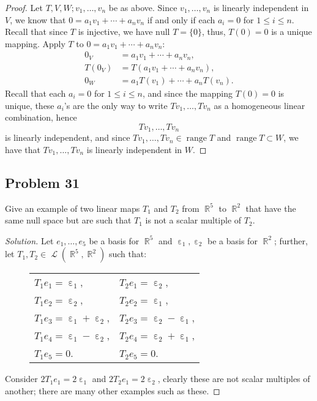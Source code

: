 \documentclass[letterpaper, 12pt]{amsart}
\DeclareMathOperator{\R}{\mathbb{R}}				%
\DeclareMathOperator{\Ell}{\mathscr{L}}				%
\DeclareMathOperator{\ep}{\varepsilon}				%
\renewcommand{\null}{\text{null }}					%
\DeclareMathOperator{\range}{\text{range }}			%
\theoremstyle{definition}  							%
\begin{document}
		\begin{proof}
		Let $T, V, W; v_{1}, \dots, v_{n}$ be as above.
		Since $v_{1}, \dots, v_{n}$ is linearly independent in $V$, we know that $0 = a_{1}v_{1} + \cdots + a_{n}v_{n}$ if and only if each $a_{i} = 0$ for $1 \leq i \leq n$.
		Recall that since $T$ is injective, we have $\null T = \{ 0 \}$, thus, $T(0) = 0$ is a unique mapping.
		Apply $T$ to $0 = a_{1}v_{1} + \cdots + a_{n}v_{n}$:
			\begin{align*}
				0_{V} &= a_{1}v_{1} + \cdots + a_{n}v_{n}, \\
				T(0_{V}) &= T(a_{1}v_{1} + \cdots + a_{n}v_{n}), \\
				0_{W} &= a_{1}T(v_{1}) + \cdots + a_{n}T(v_{n}).
			\end{align*}
		Recall that each $a_{i} = 0$ for $1 \leq i \leq n$, and since the mapping $T(0)=0$ is unique, these $a_{i}$'s are the only way to write $Tv_{1}, \dots, Tv_{n}$ as a homogeneous linear combination, hence $$Tv_{1}, \dots, Tv_{n}$$ is linearly independent, and since $Tv_{1}, \dots, Tv_{n} \in \range T$ and $\range T \subset W$, we have that $Tv_{1}, \dots, Tv_{n}$ is linearly independent in $W$.
		\end{proof}

		\subsection*{Problem 31}
		Give an example of two linear maps $T_{1}$ and $T_{2}$ from $\R^{5}$ to $\R^{2}$ that have the same null space but are such that $T_{1}$ is not a scalar multiple of $T_{2}$.

		\begin{proof}[Solution]
		Let $e_{1}, \dots, e_{5}$ be a basis for $\R^{5}$ and $\ep_{1}, \ep_{2}$ be a basis for $\R^{2}$; further, let $T_{1}, T_{2} \in \Ell(\R^{5}, \R^{2})$ such that:
			\begin{figure}[h]
				\begin{tabular}{ll}
					$T_{1}e_{1} = \ep_{1}$, & $T_{2}e_{1} = \ep_{2}$, \\
					$T_{1}e_{2} = \ep_{2}$, & $T_{2}e_{2} = \ep_{1}$, \\
					$T_{1}e_{3} = \ep_{1} + \ep_{2}$, & $T_{2}e_{3} = \ep_{2} - \ep_{1}$, \\
					$T_{1}e_{4} = \ep_{1} - \ep_{2}$, & $T_{2}e_{4} = \ep_{2} + \ep_{1}$, \\
					$T_{1}e_{5} = 0$. & $T_{2}e_{5} = 0$.
				\end{tabular}
			\end{figure}

		Consider $2T_{1}e_{1} = 2\ep_{1}$ and $2T_{2}e_{1} = 2\ep_{2}$, clearly these are not scalar multiples of another; there are many other examples such as these.
		\end{proof}
\end{document}
